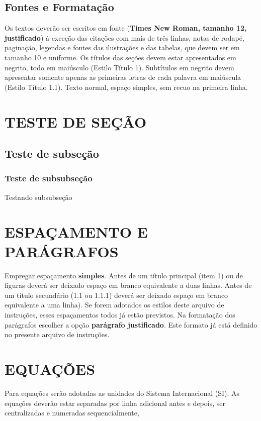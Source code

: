 \documentclass[10pt,brazil,english]{article}
\begin{document}
\subsection{Fontes e Formatação}

Os textos deverão ser escritos em fonte (\textbf{Times New Roman, tamanho 12, justificado}) à exceção das citações com mais de três linhas, notas de rodapé, paginação, legendas e fontes das ilustrações e das tabelas, que devem ser em tamanho 10 e uniforme. Os títulos das seções devem estar apresentados em negrito, todo em maiúsculo (Estilo Título 1). Subtítulos em negrito devem apresentar somente apenas as primeiras letras de cada palavra em maiúscula (Estilo Título 1.1). Texto normal, espaço simples, sem recuo na primeira linha.

\section{\uppercase {Teste de seção}}
\subsection{Teste de subseção}
\subsubsection{Teste de subsubseção}

Testando subsubseção

\section{\uppercase{Espaçamento e parágrafos}}

Empregar espaçamento \textbf{simples}. Antes de um título principal (item 1) ou de figuras deverá ser deixado espaço em branco equivalente a duas linhas. Antes de um título secundário (1.1 ou 1.1.1) deverá ser deixado espaço em branco equivalente a uma linha). Se forem adotados os estilos deste arquivo de instruções, esses espaçamentos todos já estão previstos. Na formatação dos parágrafos escolher a opção \textbf{parágrafo justificado}. Este formato já está definido no presente arquivo de instruções.

\section{\uppercase{Equações}}

Para equações serão adotadas as unidades do Sistema Internacional (SI). As equações deverão estar separadas por linha adicional antes e depois, ser centralizadas e numeradas sequencialmente,
\end{document}
